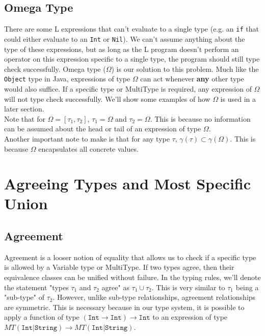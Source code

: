\documentclass[12pt]{article}
\begin{document}
\subsection{Omega Type}
There are some L expressions that can't evaluate to a single type (e.g. an \texttt{if} that could either evaluate to an \texttt{Int} or \texttt{Nil}). We can't assume anything about the type of these expressions, but as long as the L program doesn't perform an operator on this expression specific to a single type, the program should still type check successfully. Omega type ($\Omega$) is our solution to this problem. Much like the \texttt{Object} type in Java, expressions of type $\Omega$ can act whenever \textbf{any} other type would also suffice. If a specific type or MultiType is required, any expression of $\Omega$ will not type check successfully. We'll show some examples of how $\Omega$ is used in a later section.\\
Note that for $\Omega = [\tau_1, \tau_2]$, $\tau_1 = \Omega$ and $\tau_2 = \Omega$. This is because no information can be assumed about the head or tail of an expression of type $\Omega$.\\
Another important note to make is that for any type $\tau$, $\gamma(\tau) \subset \gamma(\Omega)$. This is because $\Omega$ encapsulates all concrete values. 

\section{Agreeing Types and Most Specific Union}


\subsection{Agreement}
Agreement is a looser notion of equality that allows us to check if a specific type is allowed by a Variable type or MultiType. If two types agree, then their equivalence classes can be unified without failure. In the typing rules, we'll denote the statement "types $\tau_1$ and $\tau_2$ agree" as $\tau_1\cup\tau_2$. This is very similar to $\tau_1$ being a "sub-type" of $\tau_2$. However, unlike sub-type relationships, agreement relationships are symmetric. This is necessary because in our type system, it is possible to apply a function of type $(\texttt{Int}\rightarrow\texttt{Int})\rightarrow\texttt{Int}$ to an expression of type $MT(\texttt{Int}|\texttt{String})\rightarrow MT(\texttt{Int}|\texttt{String})$.
\end{document}
